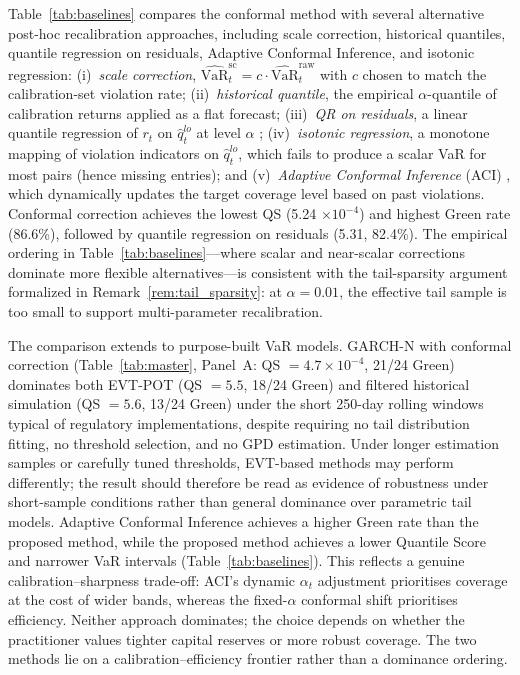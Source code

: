 \documentclass[preprint,11pt,authoryear]{elsarticle}
\newcommand{\VaR}{\mathrm{VaR}}
\newcommand{\1}{\boldsymbol{1}}
\begin{document}
	Table~\ref{tab:baselines} compares the conformal method with
	several alternative post-hoc recalibration approaches, including scale correction, historical quantiles, quantile regression on residuals, Adaptive Conformal Inference, and isotonic regression: (i)~\emph{scale correction},
	$\widehat{\VaR}_t^{\mathrm{sc}} = c \cdot
	\widehat{\VaR}_t^{\mathrm{raw}}$ with $c$ chosen to match the
	calibration-set violation rate; (ii)~\emph{historical quantile},
	the empirical $\alpha$-quantile of calibration returns applied
	as a flat forecast; (iii)~\emph{QR on residuals}, a linear
	quantile regression of $r_t$ on $\hat{q}_t^{lo}$ at level
	$\alpha$ \citep[cf.][]{romano2019conformalized};
	(iv)~\emph{isotonic regression}, a monotone mapping of
	violation indicators on $\hat{q}_t^{lo}$, which fails to
	produce a scalar VaR for most pairs (hence missing entries); and
	(v)~\emph{Adaptive Conformal Inference} (ACI) \citep{gibbs2021adaptive}, which dynamically updates the target coverage level based on past violations.
	Conformal correction achieves the lowest QS (5.24 $\times 10^{-4}$) and highest Green rate (86.6\%), followed by quantile regression on residuals (5.31, 82.4\%). The empirical ordering in Table~\ref{tab:baselines}---where scalar and near-scalar corrections dominate more flexible alternatives---is consistent with the tail-sparsity argument formalized in Remark~\ref{rem:tail_sparsity}: at $\alpha = 0.01$, the effective tail sample is too small to support multi-parameter recalibration.

	The comparison extends to purpose-built VaR models. GARCH-N with conformal correction (Table~\ref{tab:master}, Panel~A: QS $= 4.7 \times 10^{-4}$, 21/24 Green) dominates both EVT-POT (QS $= 5.5$, 18/24 Green) and filtered historical simulation (QS $= 5.6$, 13/24 Green) under the short 250-day rolling windows typical of regulatory implementations, despite requiring no tail distribution fitting, no threshold selection, and no GPD estimation. Under longer estimation samples or carefully tuned thresholds, EVT-based methods may perform differently; the result should therefore be read as evidence of robustness under short-sample conditions rather than general dominance over parametric tail models.
	Adaptive Conformal Inference \citep{gibbs2021adaptive} achieves a higher Green rate than the proposed method, while the proposed method achieves a lower Quantile Score and narrower VaR intervals (Table~\ref{tab:baselines}). This reflects a genuine calibration--sharpness trade-off: ACI's dynamic $\alpha_t$ adjustment prioritises coverage at the cost of wider bands, whereas the fixed-$\alpha$ conformal shift prioritises efficiency. Neither approach dominates; the choice depends on whether the practitioner values tighter capital reserves or more robust coverage. The two methods lie on a calibration--efficiency frontier rather than a dominance ordering.
\end{document}
